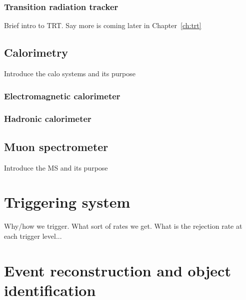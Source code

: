 \subsubsection{Transition radiation tracker} 

{\color{red} Brief intro to TRT. Say more is coming later in
  Chapter~\ref{ch:trt}}

\subsection{Calorimetry} 

{\color{red} Introduce the calo systems and its purpose}

\subsubsection{Electromagnetic calorimeter} 

\subsubsection{Hadronic calorimeter} 

\subsection{Muon spectrometer} 

{\color{red} Introduce the MS and its purpose}

\section{Triggering system}

{\color{red} Why/how we trigger. What sort of rates we get. What is the
rejection rate at each trigger level...}

\section{Event reconstruction and object identification}


